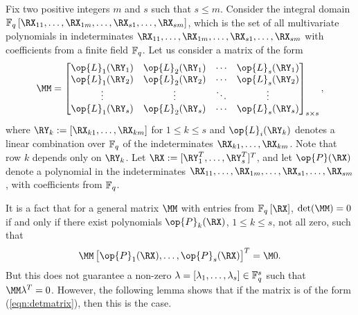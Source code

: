 Fix two positive integers $m$ and $s$ such that $s\leq m$. Consider the integral domain $\Fq\left[\RX_{11}, \ldots ,\RX_{1m},\ldots, \RX_{s1}, \ldots ,\RX_{sm}\right]$, which is the set of all multivariate polynomials in indeterminates $ \RX_{11}, \ldots ,\RX_{1m},\ldots, \RX_{s1}, \ldots ,\RX_{sm}$ with coefficients from a finite field $\mathbb{F}_q$. Let us consider a matrix of the form
\begin{align}
\MM=\begin{bmatrix}
\op{L}_1(\RY_1)&\op{L}_2(\RY_1)&\cdots &\op{L}_s(\RY_1) \\
\op{L}_1(\RY_2)&\op{L}_2(\RY_2)&\cdots &\op{L}_s(\RY_2) \\
\vdots & \vdots & \ddots & \vdots\\
\op{L}_1(\RY_s)&\op{L}_2(\RY_s)&\cdots &\op{L}_s(\RY_s)
\end{bmatrix}_{s \times s}, \label{eqn:detmatrix}
\end{align}
where $\RY_k:=[\RX_{k1}, \ldots ,\RX_{km}]$ for $1 \leq k \leq s$ and $\op{L}_{i}(\RY_k)$  denotes a linear combination over $\mathbb{F}_q $ of the indeterminates $ \RX_{k1}, \ldots ,\RX_{km}$. Note that row $k$ depends only on $\RY_k$.  Let  $\RX := [\RY^T_1, \ldots, \RY^T_s]^T$, and let $\op{P}(\RX)$ denote a polynomial in the indeterminates $ \RX_{11}, \ldots ,\RX_{1m},\ldots, \RX_{s1}, \ldots ,\RX_{sm}$, with coefficients from $\mathbb{F}_q$. 
 
It is a fact \cite[p.~528]{bourbaki1989algebra} that  for a general matrix $\MM$ with entries from $\Fq\left[\RX\right]$, $\det(\MM)=0$ if and only if  there exist polynomials $\op{P}_k (\RX)$, $1 \leq k \leq s$, not all zero,  such that
\begin{align*}
\MM \begin{bmatrix} \op{P}_1(\RX)  , \ldots ,  {\op{P}_s} (\RX) \end{bmatrix}^T= \M0.
\end{align*}
But this does not guarantee a non-zero $\lambda = [\lambda_1, \ldots, \lambda_s]  \in \mathbb{F}_q^s$ such that $ \MM \lambda^T= 0$.  However, the following lemma shows that if the matrix is of the form  (\ref{eqn:detmatrix}), then this is the case.


